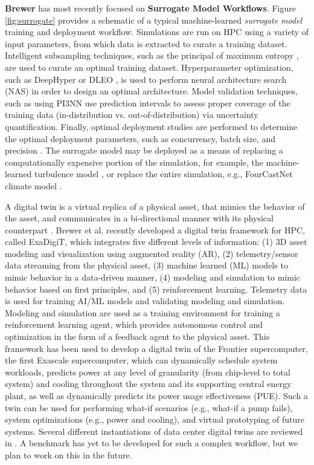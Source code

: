 


{\bf Brewer} has most recently focused on  {\bf Surrogate Model Workflows}. Figure \ref{fig:surrogate} provides a schematic of a typical machine-learned \textit{surrogate model} training and deployment workflow. Simulations are run on HPC using a variety of input parameters, from which data is extracted to curate a training dataset. Intelligent subsampling techniques, such as the principal of maximum entropy \cite{brewer2023entropy}, are used to curate an optimal training dataset. Hyperparameter optimization, such as DeepHyper \cite{balaprakash2018deephyper} or DLEO \cite{martinez2018deep}, is used to perform neural architecture search (NAS) in order to design an optimal architecture. Model validation techniques, such as using PI3NN \cite{liu2021pi3nn} use prediction intervals to assess proper coverage of the training data (in-distribution vs. out-of-distribution) via uncertainty quantification. Finally, optimal deployment studies are performed to determine the optimal deployment parameters, such as concurrency, batch size, and precision \cite{brewer2021production}. The surrogate model may be deployed as a means of replacing a computationally expensive portion of the simulation, for example, the machine-learned turbulence model \cite{bhushan2021development}, or replace the entire simulation, e.g., FourCastNet climate model \cite{pathak2022fourcastnet}.

A digital twin is a virtual replica of a physical asset, that mimics the behavior of the asset, and communicates in a bi-directional manner with its physical counterpart \cite{nas2023foundational}.   Brewer et al. \cite{brewer2024digital} recently developed a digital twin framework for HPC, called ExaDigiT, which integrates five different levels of information: (1) 3D asset modeling and visualization using augmented reality (AR), (2) telemetry/sensor data streaming from the physical asset, (3) machine learned (ML) models to mimic behavior in a data-driven manner, (4) modeling and simulation to mimic behavior based on first principles, and (5) reinforcement learning. Telemetry data is used for training AI/ML models and validating modeling and simulation. Modeling and simulation are used as a training environment for training a reinforcement learning agent, which provides autonomous control and optimization in the form of a feedback agent to the physical asset. This framework has been used to develop a digital twin of the Frontier supercomputer, the first Exascale supercomputer, which can dynamically schedule system workloads, predicts power at any level of granularity (from chip-level to total system) and cooling throughout the system and its supporting central energy plant, as well as dynamically predicts its power usage effectiveness (PUE). Such a twin can be used for performing what-if scenarios (e.g., what-if a pump fails), system optimizations (e.g., power and cooling), and virtual prototyping of future systems. Several different instantiations of data center digital twins are reviewed in \cite{athavale2024digital}. A benchmark has yet to be developed for such a complex workflow, but we plan to work on this in the future. 


